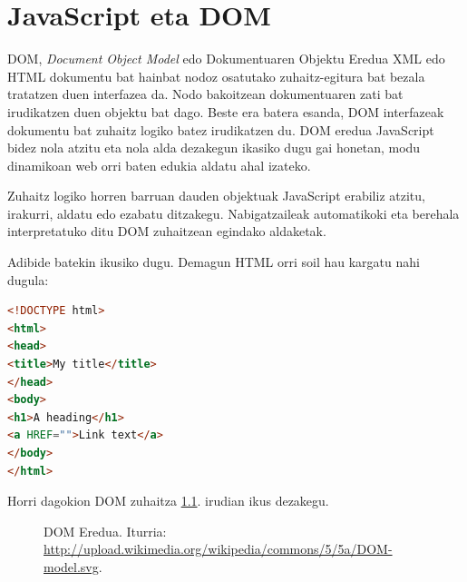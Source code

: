 \chapter{JavaScript eta DOM}

DOM, \textit{Document Object Model} edo Dokumentuaren Objektu Eredua XML edo HTML dokumentu bat hainbat nodoz osatutako zuhaitz-egitura bat bezala tratatzen duen interfazea da.  Nodo bakoitzean dokumentuaren zati bat irudikatzen duen objektu bat dago. Beste era batera esanda, DOM interfazeak dokumentu bat zuhaitz logiko batez irudikatzen du.  DOM eredua JavaScript bidez nola atzitu eta nola alda dezakegun ikasiko dugu gai honetan, modu dinamikoan web orri baten edukia aldatu ahal izateko. 

Zuhaitz logiko horren barruan dauden objektuak JavaScript erabiliz atzitu, irakurri, aldatu edo ezabatu ditzakegu.
Nabigatzaileak automatikoki eta berehala interpretatuko ditu DOM zuhaitzean egindako aldaketak.

Adibide batekin ikusiko dugu. Demagun HTML orri soil hau kargatu nahi dugula:

\begin{lstlisting}[language=HTML,numbers=none]
<!DOCTYPE html>
<html>
<head>
<title>My title</title>
</head>
<body>
<h1>A heading</h1>
<a HREF="">Link text</a>
</body>
</html>
\end{lstlisting}


Horri dagokion DOM zuhaitza \ref{fig:DOM}. irudian ikus dezakegu.

\begin{figure}[ht]
	\centering
{}
\caption{DOM Eredua. Iturria: \newline
\href{http://upload.wikimedia.org/wikipedia/commons/5/5a/DOM-model.svg}{http://upload.wikimedia.org/wikipedia/commons/5/5a/DOM-model.svg}.}
\label{fig:DOM}
\end{figure}

